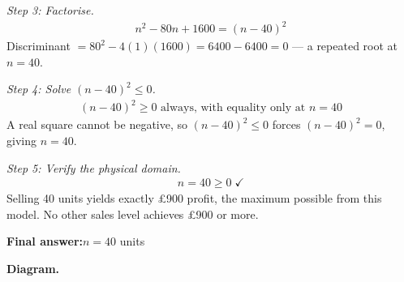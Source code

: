 \documentclass[11pt]{article}
\begin{document}
\textit{Step 3: Factorise.}
\[\begin{gathered}
n^2 - 80n + 1600 = (n - 40)^2
\end{gathered}\]
Discriminant \( = 80^2 - 4(1)(1600) = 6400 - 6400 = 0 \) --- a repeated root at \( n = 40 \).

\textit{Step 4: Solve \( (n - 40)^2 \leq 0 \).}
\[\begin{gathered}
(n - 40)^2 \geq 0 \text{ always, with equality only at } n = 40
\end{gathered}\]
A real square cannot be negative, so \( (n - 40)^2 \leq 0 \) forces \( (n - 40)^2 = 0 \), giving \( n = 40 \).

\textit{Step 5: Verify the physical domain.}
\[\begin{gathered}
n = 40 \geq 0 \;\checkmark
\end{gathered}\]
Selling 40 units yields exactly \pounds 900 profit, the maximum possible from this model. No other sales level achieves \pounds 900 or more.

\begin{answerbox}
\textbf{Final answer:}\quad \(\displaystyle n = 40\) units
\end{answerbox}
\textbf{Diagram.}
\end{document}
